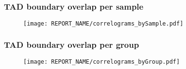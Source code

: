 \documentclass{beamer}
\begin{document}

\begin{frame}
\frametitle{TAD boundary overlap per sample}
\begin{figure}
\centering
\texttt{[image: REPORT\_NAME/correlograms\_bySample.pdf]}
\end{figure}
\end{frame}


\begin{frame}
\frametitle{TAD boundary overlap per group}
\begin{figure}
\centering
\texttt{[image: REPORT\_NAME/correlograms\_byGroup.pdf]}
\end{figure}
\end{frame}
\end{document}

